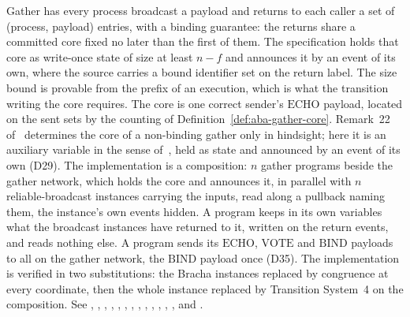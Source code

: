 Gather has every process broadcast a payload and returns to each caller a set of (process, payload) entries, with a binding guarantee: the returns share a committed core fixed no later than the first of them.
The specification holds that core as write-once state of size at least $n - f$ and announces it by an event of its own, where the source carries a bound identifier set on the return label.
The size bound is provable from the prefix of an execution, which is what the transition writing the core requires.
The core is one correct sender's $\mathrm{ECHO}$ payload, located on the sent sets by the counting of Definition~\ref{def:aba-gather-core}.
Remark~22 of~\cite{AFW25} determines the core of a non-binding gather only in hindsight; here it is an auxiliary variable in the sense of~\cite{AL91}, held as state and announced by an event of its own (D29).
The implementation is a composition: $n$ gather programs beside the gather network, which holds the core and announces it, in parallel with $n$ reliable-broadcast instances carrying the inputs, read along a pullback naming them, the instance's own events hidden.
A program keeps in its own variables what the broadcast instances have returned to it, written on the return events, and reads nothing else.
A program sends its $\mathrm{ECHO}$, $\mathrm{VOTE}$ and $\mathrm{BIND}$ payloads to all on the gather network, the $\mathrm{BIND}$ payload once (D35).
The implementation is verified in two substitutions: the Bracha instances replaced by congruence at every coordinate, then the whole instance replaced by Transition System~4 on the composition.
See , , , , , , , , , , , , ,  and .




